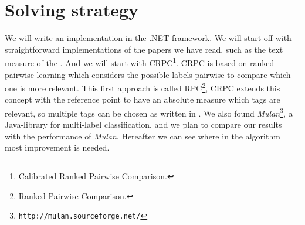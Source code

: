 \section{Solving strategy}
We will write an implementation in the .NET framework. We will start off with straightforward implementations of the papers we have read, such as the text measure of the \cite{jing2006ontology}. And we will start with CRPC\footnote{Calibrated Ranked Pairwise Comparison.}. CRPC is based on ranked pairwise learning which considers the possible labels pairwise to compare which one is more relevant. This first approach is called RPC\footnote{Ranked Pairwise Comparison.}, CRPC extends this concept with the reference point to have an absolute measure which tags are relevant, so multiple tags can be chosen as written in \cite{journals/ml/FurnkranzHMB08}. We also found \emph{Mulan}\footnote{\texttt{http://mulan.sourceforge.net/}}, a Java-library for multi-label classification, and we plan to compare our results with the performance of \emph{Mulan}. Hereafter we can see where in the algorithm most improvement is needed.